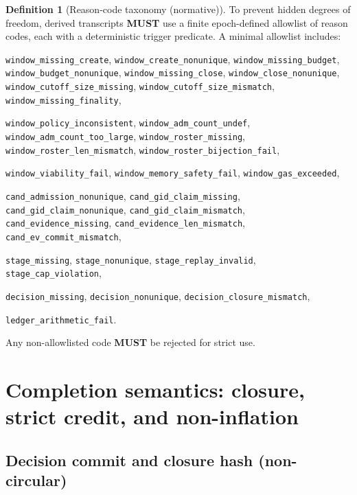\documentclass[11pt]{article}
\newcommand{\MUST}{\textbf{MUST}}
\newcommand{\code}[1]{\texttt{#1}}
\newcommand{\1}{\mathbf{1}}
\theoremstyle{definition}
\newtheorem{definition}{Definition}
\theoremstyle{plain}
\begin{document}
\begin{definition}[Reason-code taxonomy (normative)]
\label{def:reasons}
To prevent hidden degrees of freedom, derived transcripts \MUST{} use a finite epoch-defined allowlist of reason codes, each with a deterministic trigger predicate. A minimal allowlist includes:
\begin{tightitemize}
\item \code{window\_missing\_create}, \code{window\_create\_nonunique}, \code{window\_missing\_budget}, \code{window\_budget\_nonunique}, \code{window\_missing\_close}, \code{window\_close\_nonunique}, \code{window\_cutoff\_size\_missing}, \code{window\_cutoff\_size\_mismatch}, \code{window\_missing\_finality},
\item \code{window\_policy\_inconsistent}, \code{window\_adm\_count\_undef}, \code{window\_adm\_count\_too\_large}, \code{window\_roster\_missing}, \code{window\_roster\_len\_mismatch}, \code{window\_roster\_bijection\_fail},
\item \code{window\_viability\_fail}, \code{window\_memory\_safety\_fail}, \code{window\_gas\_exceeded},
\item \code{cand\_admission\_nonunique}, \code{cand\_gid\_claim\_missing}, \code{cand\_gid\_claim\_nonunique}, \code{cand\_gid\_claim\_mismatch}, \code{cand\_evidence\_missing}, \code{cand\_evidence\_len\_mismatch}, \code{cand\_ev\_commit\_mismatch},
\item \code{stage\_missing}, \code{stage\_nonunique}, \code{stage\_replay\_invalid}, \code{stage\_cap\_violation},
\item \code{decision\_missing}, \code{decision\_nonunique}, \code{decision\_closure\_mismatch},
\item \code{ledger\_arithmetic\_fail}.
\end{tightitemize}
Any non-allowlisted code \MUST{} be rejected for strict use.
\end{definition}

\section{Completion semantics: closure, strict credit, and non-inflation}
\label{sec:closure}

\subsection{Decision commit and closure hash (non-circular)}
\end{document}
